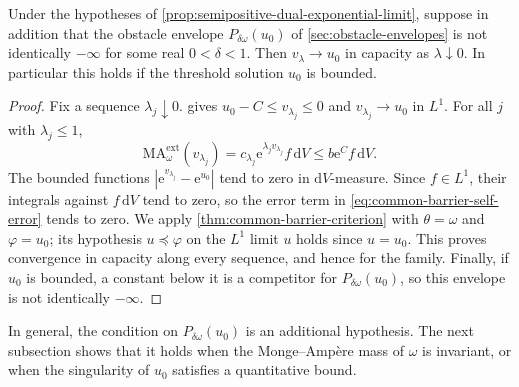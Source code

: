 \begin{corollary}\label{cor:semipositive-dual-capacity-limit}
Under the hypotheses of \cref{prop:semipositive-dual-exponential-limit}, suppose in addition that the obstacle envelope $P_{\delta\omega}(u_0)$ of \cref{sec:obstacle-envelopes} is not identically $-\infty$ for some real $0<\delta<1$. Then $v_\lambda\to u_0$ in capacity as $\lambda\downarrow0$. In particular this holds if the threshold solution $u_0$ is bounded.
\end{corollary}
\begin{proof}
Fix a sequence $\lambda_j\downarrow0$.  gives $u_0-C\leq v_{\lambda_j}\leq0$ and $v_{\lambda_j}\to u_0$ in $L^1$. For all $j$ with $\lambda_j\leq1$,
\[
 \mathrm{MA}^{\mathrm{ext}}_\omega(v_{\lambda_j})
   =c_{\lambda_j}\mathrm{e}^{\lambda_jv_{\lambda_j}}f\,\mathrm{d}V
   \leq b\mathrm{e}^{C}f\,\mathrm{d}V.
\]
The bounded functions $|\mathrm{e}^{v_{\lambda_j}}-\mathrm{e}^{u_0}|$ tend to zero in $\mathrm{d}V$-measure. Since $f\in L^1$, their integrals against $f\,\mathrm{d}V$ tend to zero, so the error term in \eqref{eq:common-barrier-self-error} tends to zero. We apply \cref{thm:common-barrier-criterion} with $\theta=\omega$ and $\varphi=u_0$; its hypothesis $u\preceq\varphi$ on the $L^1$ limit $u$ holds since $u=u_0$. This proves convergence in capacity along every sequence, and hence for the family. Finally, if $u_0$ is bounded, a constant below it is a competitor for $P_{\delta\omega}(u_0)$, so this envelope is not identically $-\infty$.
\end{proof}

In general, the condition on $P_{\delta\omega}(u_0)$ is an additional hypothesis. The next subsection shows that it holds when the Monge--Amp\`ere mass of $\omega$ is invariant, or when the singularity of $u_0$ satisfies a quantitative bound.
